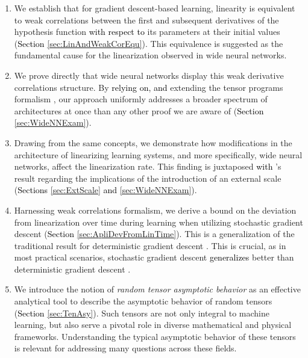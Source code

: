 \documentclass{article} %
\begin{document}
\begin{enumerate}

\item 
We establish that for gradient descent-based learning, linearity is equivalent to weak correlations between the first and subsequent derivatives of the hypothesis function \textcolor{black}{with respect to} its parameters at their initial values (\textcolor{black}{Section} \ref{sec:LinAndWeakCorEqu}). This equivalence is suggested as the fundamental cause for the linearization observed in wide neural networks.

\item
We prove directly that wide neural networks display this weak derivative correlations structure. By \textcolor{black}{relying on, and} extending the tensor programs formalism \cite{TensorProgramsiib2021}, our approach uniformly addresses a broader spectrum of architectures at once than any other proof we are aware of (\textcolor{black}{Section} \ref{sec:WideNNExam}).

\item 
Drawing from the same concepts, we demonstrate how modifications in the architecture of linearizing learning systems, and more specifically, wide neural networks, affect the linearization rate. This finding is juxtaposed \textcolor{black}{with} \cite{OnLazyTraining2019}'s result regarding the implications of the introduction of an external scale (\textcolor{black}{Sections} \ref{sec:ExtScale} \textcolor{black}{and} \ref{sec:WideNNExam}).

\item 
Harnessing weak correlations formalism, we derive a bound on the deviation from linearization over time during learning when utilizing stochastic gradient descent (\textcolor{black}{Section} \ref{sec:ApliDevFromLinTime}). This is a generalization of the traditional result for deterministic gradient descent \cite{WideNNEvLinGD2019}. This is crucial, as in most practical scenarios, stochastic gradient descent \textcolor{black}{generalizes} better than deterministic gradient descent \cite{FiniteVersusInfinite2020,DeepVsKernelEmp2020}.

\item  
We introduce the notion of \textit{random tensor asymptotic behavior} as an effective analytical tool to describe the asymptotic behavior of random tensors (\textcolor{black}{Section} \ref{sec:TenAsy}). Such tensors are not only integral to machine learning, but also serve a pivotal role in diverse mathematical and physical frameworks. Understanding the typical asymptotic behavior of these tensors is relevant for addressing many questions across these fields.  

\end{enumerate}
\end{document}
